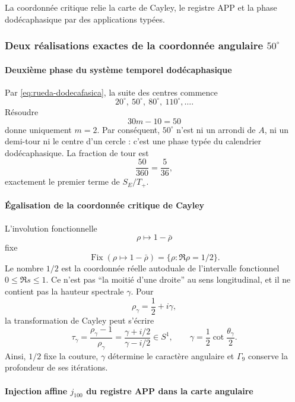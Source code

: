 \noindent La coordonnée critique relie la carte de Cayley, le registre APP et la phase dodécaphasique par des applications typées.\par\medskip

\subsubsection{Deux réalisations exactes de la coordonnée angulaire \(50^\circ\)}

\paragraph{Deuxième phase du système temporel dodécaphasique}

Par \eqref{eq:rueda-dodecafasica}, la suite des centres commence
\[
20^\circ,\ 50^\circ,\ 80^\circ,\ 110^\circ,\ldots.
\]
Résoudre
\[
30m-10=50
\]
donne uniquement \(m=2\). Par conséquent, \(50^\circ\) n'est ni un arrondi de \(A\),
ni un demi-tour ni le centre d'un cercle : c'est une phase typée du calendrier
dodécaphasique. La fraction de tour est
\[
\frac{50}{360}=\frac5{36},
\]
exactement le premier terme de \(S_E/T_+\).

\paragraph{Égalisation de la coordonnée critique de Cayley}

L'involution fonctionnelle
\[
\rho\longmapsto1-\bar\rho
\]
fixe
\[
\operatorname{Fix}(\rho\mapsto1-\bar\rho)
=\{\rho:\Re\rho=1/2\}.
\]
Le nombre \(1/2\) est la coordonnée réelle autoduale de l'intervalle fonctionnel
\(0\leq\Re s\leq1\). Ce n'est pas \enquote{la moitié d'une droite} au sens
longitudinal, et il ne contient pas la hauteur spectrale \(\gamma\). Pour
\[
\rho_\gamma=\frac12+i\gamma,
\]
la transformation de Cayley peut s'écrire
\begin{equation}
\tau_\gamma
=\frac{\rho_\gamma-1}{\rho_\gamma}
=\frac{\gamma+i/2}{\gamma-i/2}
\in S^1,
\qquad
\gamma=\frac12\cot\frac{\theta_\gamma}{2}.
\label{eq:cayley-critica}
\end{equation}
Ainsi, \(1/2\) fixe la couture, \(\gamma\) détermine le caractère angulaire et
\(\Gamma_9\) conserve la profondeur de ses itérations.

\paragraph{Injection affine \(j_{100}\) du registre APP dans la carte angulaire}

